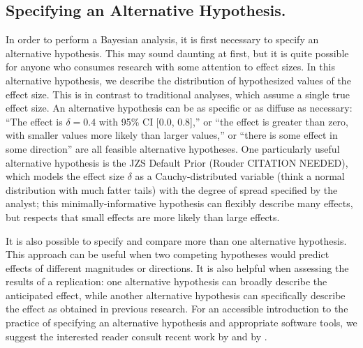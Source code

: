\documentclass[fignum,nobf,man]{apa}
\begin{document}
\subsection{Specifying an Alternative Hypothesis.  }
In order to perform a Bayesian analysis, it is first necessary to specify an alternative hypothesis. This may sound daunting at first, but it is quite possible for anyone who consumes research with some attention to effect sizes. In this alternative hypothesis, we describe the distribution of hypothesized values of the effect size. This is in contrast to traditional analyses, which assume a single true effect size. An alternative hypothesis can be as specific or as diffuse as necessary: ``The effect is $\delta = 0.4$ with 95\% CI [0.0, 0.8],'' or ``the effect is greater than zero, with smaller values more likely than larger values,'' or ``there is some effect in some direction'' are all feasible alternative hypotheses. One particularly useful alternative hypothesis is the JZS Default Prior (Rouder CITATION NEEDED), which models the effect size $\delta$ as a Cauchy-distributed variable (think a normal distribution with much fatter tails) with the degree of spread specified by the analyst; this minimally-informative hypothesis can flexibly describe many effects, but respects that small effects are more likely than large effects.

It is also possible to specify and compare more than one alternative hypothesis. This approach can be useful when two competing hypotheses would predict effects of different magnitudes or directions. It is also helpful when assessing the results of a replication: one alternative hypothesis can broadly describe the anticipated effect, while another alternative hypothesis can specifically describe the effect as obtained in previous research. \citep[see][for an example]{Boekel:etal:2014} %
For an accessible introduction to the practice of specifying an alternative hypothesis and appropriate software tools, we suggest the interested reader consult recent work by \citet{Dienes:2011,Dienes:2014} and by \citet{Rouder:Morey:2012, Rouder:etal:2012}. %
\end{document}
